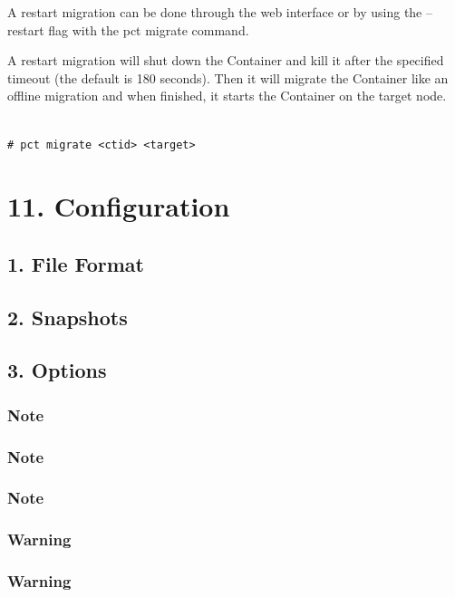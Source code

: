 A restart migration can be done through the web interface or by using the --restart flag with the pct migrate command.

A restart migration will shut down the Container and kill it after the specified timeout (the default is 180 seconds). Then it will migrate the Container like an offline migration and when finished, it starts the Container on the target node.

\begin{lstlisting}

# pct migrate <ctid> <target>

\end{lstlisting}


\section{11. Configuration}

\subsection{1. File Format}

\subsection{2. Snapshots}

\subsection{3. Options}

\subsubsection{Note}

\subsubsection{Note}

\subsubsection{Note}

\subsubsection{Warning}

\subsubsection{Warning}

